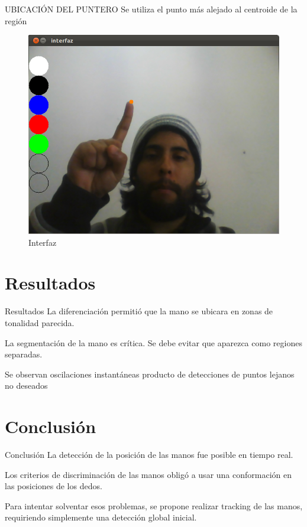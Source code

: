 \documentclass{beamer}
\begin{document}
\begin{frame}{UBICACIÓN DEL PUNTERO}
	Se utiliza el punto más alejado al centroide de la región

	\begin{figure}[tbhp]
	\centerline{\includegraphics[scale=0.2]{7_interfaz}}
	\caption{Interfaz}
	\label{fig:7_interfaz}
	\end{figure}
\end{frame}

\section{Resultados}
	

\begin{frame}{Resultados}
La diferenciación permitió que la mano se ubicara en zonas de tonalidad parecida. 

La segmentación de la mano es crítica. Se debe evitar que aparezca como regiones separadas.

Se observan oscilaciones instantáneas producto de detecciones de puntos lejanos no deseados
\end{frame}


\section{Conclusión}
\begin{frame}{Conclusión}
		La detección de la posición de las manos fue posible en tiempo real.

		Los criterios de discriminación de las manos obligó a 
		usar una conformación en las posiciones de los dedos. 

		Para intentar solventar esos problemas, se propone realizar tracking
		de las manos, requiriendo simplemente una detección global inicial.
\end{frame}
\end{document}
